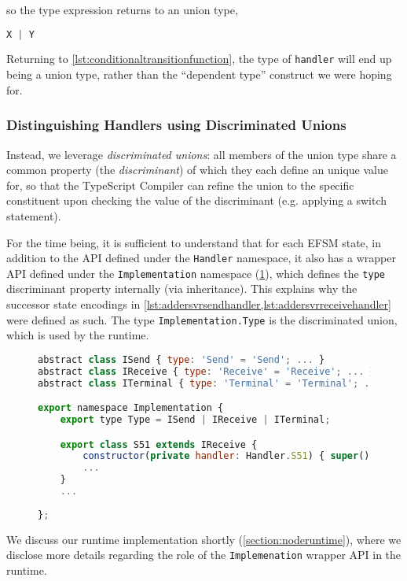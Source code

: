 so the type expression returns to an union type,

\begin{lstlisting}[language=javascript,numbers=none]
X | Y
\end{lstlisting}

Returning to \cref{lst:conditionaltransitionfunction}, 
the type of \texttt{handler} will end up being a union type, 
rather than the ``dependent type''
construct we were hoping for.

\subsubsection{Distinguishing Handlers using Discriminated Unions}

Instead, we leverage \textit{discriminated unions}: all members
of the union type share a common property (the \textit{discriminant})
of which they each define an
unique value for, so that the TypeScript Compiler can refine the union
to the specific constituent upon checking the value of the discriminant
(e.g. applying a switch statement).

For the time being,
it is sufficient to understand that for each EFSM state,
in addition to the API defined under the
\texttt{Handler} namespace, it also has a wrapper API defined under
the \texttt{Implementation} namespace (\cref{lst:nodeefsmimplementation}),
which defines the \texttt{type}
discriminant property internally (via inheritance).
This explains why the successor
state encodings in 
\cref{lst:addersvrsendhandler,lst:addersvrreceivehandler}
were defined as such.
The type \texttt{Implementation.Type} is the discriminated union,
which is used by the runtime.

\begin{figure}[!h]
\begin{lstlisting}[language=javascript,tabsize=2]
abstract class ISend { type: 'Send' = 'Send'; ... }
abstract class IReceive { type: 'Receive' = 'Receive'; ... }
abstract class ITerminal { type: 'Terminal' = 'Terminal'; ... }

export namespace Implementation {
	export type Type = ISend | IReceive | ITerminal;

	export class S51 extends IReceive {
		constructor(private handler: Handler.S51) { super(); }
		...
	}
	...
	
};
\end{lstlisting}
\label{lst:nodeefsmimplementation}
\end{figure}

We discuss our runtime implementation shortly 
(\cref{section:noderuntime}), where we disclose more details regarding
the role of the \texttt{Implemenation} wrapper API in
the runtime.
